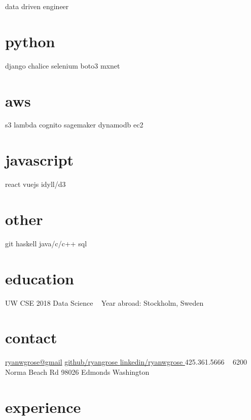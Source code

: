 \documentclass[]{friggeri-cv}
\begin{document}
       {data driven engineer}


\begin{aside}
  \section{python}
    django
    chalice
    selenium
    boto3
    mxnet
  \section{aws}
    s3
    lambda
    cognito
    sagemaker
    dynamodb
    ec2
  \section{javascript}
    react
    vuejs
    idyll/d3
  \section{other}
    git
    haskell
    java/c/c++
    sql
  \section{education}
    UW CSE 2018
    Data Science
    ~
    Year abroad:
    Stockholm, Sweden
  \section{contact}
    \href{mailto:ryanwgrose@gmail.com}{ryanwgrose@gmail\faEnvelope}
    \href{https://www.github.com/ryangrose}{github/ryangrose \faGithub}
    \href{https://www.linkedin.com/in/ryanwgrose}{linkedin/ryanwgrose \faLinkedin}
    425.361.5666 \faPhone
    ~
    6200 Norma Beach Rd
    98026 Edmonds
    Washington
\end{aside}

\section{experience}
\end{document}
